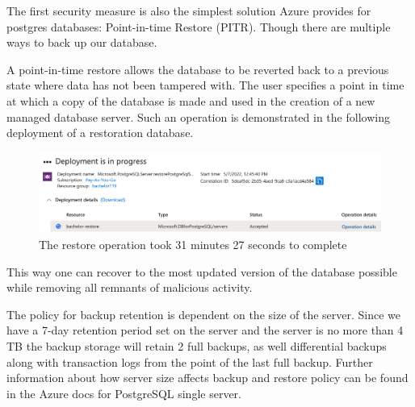 The first security measure is also the simplest solution Azure provides for postgres databases: Point-in-time Restore (PITR). Though there are multiple ways to back up our database.

A point-in-time restore allows the database to be reverted back to a previous state where data has not been tampered with. The user specifies a point in time at which a copy of the database is made and used in the creation of a new managed database server. Such an operation is demonstrated in the following deployment of a restoration database.

\begin{figure}[H]
    \centering
    \includegraphics[width=\textwidth]{figures/postgres/restore_database.png}
    \caption{The restore operation took 31 minutes 27 seconds to complete}
    \label{fig:my_label}
\end{figure}

This way one can recover to the most updated version of the database possible while removing all remnants of malicious activity.

The policy for backup retention is dependent on the size of the server. Since we have a 7-day retention period set on the server and the server is no more than 4 TB the backup storage will retain 2 full backups, as well differential backups along with transaction logs from the point of the last full backup. Further information about how server size affects backup and restore policy can be found in the Azure docs for PostgreSQL single server.




